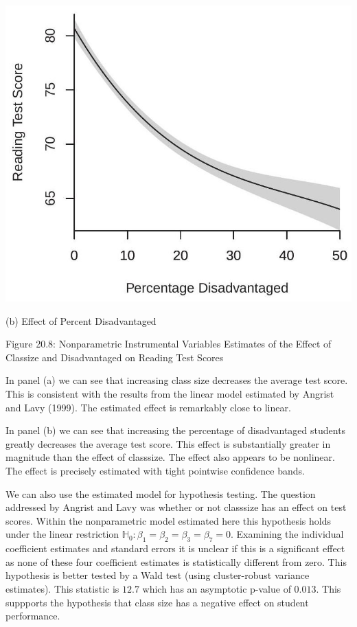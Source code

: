 \documentclass[10pt]{article}
\begin{document}
\includegraphics[max width=\textwidth]{2022_10_23_2b38d6d54e7725c196e7g-31(1)}

(b) Effect of Percent Disadvantaged

Figure 20.8: Nonparametric Instrumental Variables Estimates of the Effect of Classize and Disadvantaged on Reading Test Scores

In panel (a) we can see that increasing class size decreases the average test score. This is consistent with the results from the linear model estimated by Angrist and Lavy (1999). The estimated effect is remarkably close to linear.

In panel (b) we can see that increasing the percentage of disadvantaged students greatly decreases the average test score. This effect is substantially greater in magnitude than the effect of classsize. The effect also appears to be nonlinear. The effect is precisely estimated with tight pointwise confidence bands.

We can also use the estimated model for hypothesis testing. The question addressed by Angrist and Lavy was whether or not classsize has an effect on test scores. Within the nonparametric model estimated here this hypothesis holds under the linear restriction $\mathbb{H}_{0}: \beta_{1}=\beta_{2}=\beta_{3}=\beta_{7}=0$. Examining the individual coefficient estimates and standard errors it is unclear if this is a significant effect as none of these four coefficient estimates is statistically different from zero. This hypothesis is better tested by a Wald test (using cluster-robust variance estimates). This statistic is $12.7$ which has an asymptotic $\mathrm{p}$-value of $0.013$. This suppports the hypothesis that class size has a negative effect on student performance.
\end{document}
